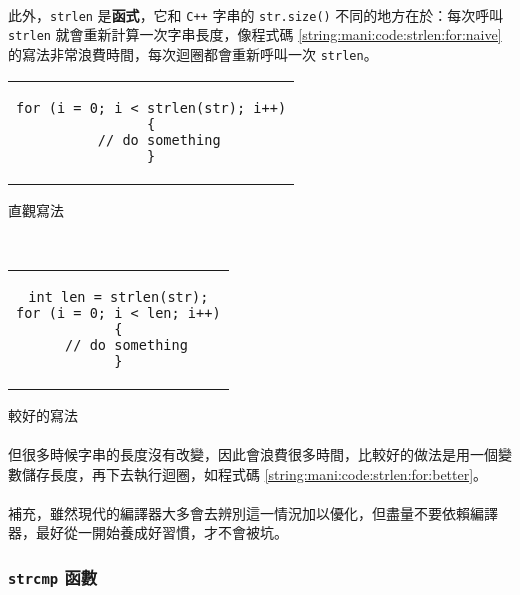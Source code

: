 \documentclass[12pt,a4paper,oneside]{report}
\begin{document}
\begin{CJK}{UTF8}{bkai}
\paragraph{}此外，\lstinline!strlen! 是{\color{blue}\textbf{函式}}，它和 \texttt{C++} 字串的 \lstinline!str.size()! 不同的地方在於：每次呼叫 \lstinline!strlen! 就會重新計算一次字串長度，像程式碼 \ref{string:mani:code:strlen:for:naive} 的寫法非常浪費時間，每次迴圈都會重新呼叫一次 \lstinline!strlen!。

\begin{code}[h!]
  \centering
  \begin{subcode}{.58\textwidth}
    \centering
    \begin{tabular}{c}
    \begin{lstlisting}
for (i = 0; i < strlen(str); i++)
{
  // do something
}
    \end{lstlisting}
    \end{tabular}
    \caption{直觀寫法}
    \label{string:mani:code:strlen:for:naive}
  \end{subcode}
  ~
  \begin{subcode}{.38\textwidth}
    \centering
    \begin{tabular}{c}
    \begin{lstlisting}
int len = strlen(str);
for (i = 0; i < len; i++)
{
  // do something
}
    \end{lstlisting}
    \end{tabular}
    \caption{較好的寫法}
    \label{string:mani:code:strlen:for:better}
  \end{subcode}
  \caption{注意 \lstinline!strlen! 的用法}
  \label{string:mani:code:strlen:for}
\end{code}

\paragraph{}但很多時候字串的長度沒有改變，因此會浪費很多時間，比較好的做法是用一個變數儲存長度，再下去執行迴圈，如程式碼 \ref{string:mani:code:strlen:for:better}。
\paragraph{}補充，雖然現代的編譯器大多會去辨別這一情況加以優化，但盡量不要依賴編譯器，最好從一開始養成好習慣，才不會被坑。

\subsubsection{\lstinline!strcmp! 函數}


\end{CJK}
\end{document}
